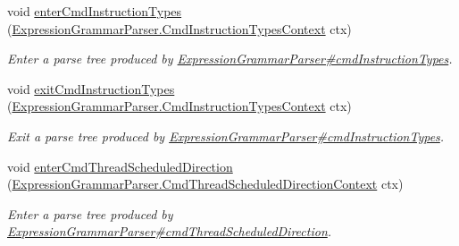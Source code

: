 \begin{DoxyCompactItemize}
void \hyperlink{interfacegov_1_1nasa_1_1jpf_1_1inspector_1_1server_1_1expression_1_1parser_1_1_expression_grammar_listener_ad70433a347b7873af2542ab33a9908d1}{enter\+Cmd\+Instruction\+Types} (\hyperlink{classgov_1_1nasa_1_1jpf_1_1inspector_1_1server_1_1expression_1_1parser_1_1_expression_grammar_pab3186941420d0c466c6d856eeff6b665}{Expression\+Grammar\+Parser.\+Cmd\+Instruction\+Types\+Context} ctx)
\begin{DoxyCompactList}\small\item\em Enter a parse tree produced by \hyperlink{classgov_1_1nasa_1_1jpf_1_1inspector_1_1server_1_1expression_1_1parser_1_1_expression_grammar_parser_a12e3659aace4eacebed317642d151170}{Expression\+Grammar\+Parser\#cmd\+Instruction\+Types}. \end{DoxyCompactList}\item 
void \hyperlink{interfacegov_1_1nasa_1_1jpf_1_1inspector_1_1server_1_1expression_1_1parser_1_1_expression_grammar_listener_ad84a63e54bfa79c494ed542506d5ddb4}{exit\+Cmd\+Instruction\+Types} (\hyperlink{classgov_1_1nasa_1_1jpf_1_1inspector_1_1server_1_1expression_1_1parser_1_1_expression_grammar_pab3186941420d0c466c6d856eeff6b665}{Expression\+Grammar\+Parser.\+Cmd\+Instruction\+Types\+Context} ctx)
\begin{DoxyCompactList}\small\item\em Exit a parse tree produced by \hyperlink{classgov_1_1nasa_1_1jpf_1_1inspector_1_1server_1_1expression_1_1parser_1_1_expression_grammar_parser_a12e3659aace4eacebed317642d151170}{Expression\+Grammar\+Parser\#cmd\+Instruction\+Types}. \end{DoxyCompactList}\item 
void \hyperlink{interfacegov_1_1nasa_1_1jpf_1_1inspector_1_1server_1_1expression_1_1parser_1_1_expression_grammar_listener_aef6d41ce7721804aa0f6bd6b1ffe904c}{enter\+Cmd\+Thread\+Scheduled\+Direction} (\hyperlink{classgov_1_1nasa_1_1jpf_1_1inspector_1_1server_1_1expression_1_1parser_1_1_expression_grammar_pa3ae49d5d83c380526042a5aff91ee0a2}{Expression\+Grammar\+Parser.\+Cmd\+Thread\+Scheduled\+Direction\+Context} ctx)
\begin{DoxyCompactList}\small\item\em Enter a parse tree produced by \hyperlink{classgov_1_1nasa_1_1jpf_1_1inspector_1_1server_1_1expression_1_1parser_1_1_expression_grammar_parser_aa1e14518e300b02c71f006c270cb4c41}{Expression\+Grammar\+Parser\#cmd\+Thread\+Scheduled\+Direction}. \end{DoxyCompactList}\item 

\end{DoxyCompactItemize}
